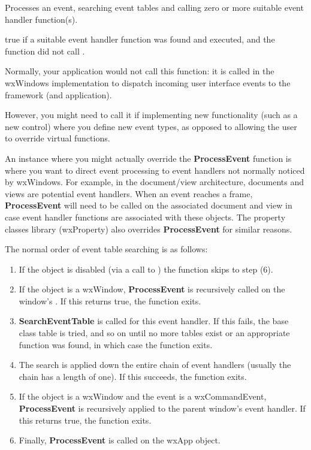 \label{wxevthandlerprocessevent}


Processes an event, searching event tables and calling zero or more suitable event handler function(s).




true if a suitable event handler function was found and executed, and the function did not
call .


Normally, your application would not call this function: it is called in the wxWindows
implementation to dispatch incoming user interface events to the framework (and application).

However, you might need to call it if implementing new functionality (such as a new control) where
you define new event types, as opposed to allowing the user to override virtual functions.

An instance where you might actually override the {\bf ProcessEvent} function is where you want
to direct event processing to event handlers not normally noticed by wxWindows. For example,
in the document/view architecture, documents and views are potential event handlers.
When an event reaches a frame, {\bf ProcessEvent} will need to be called on the associated
document and view in case event handler functions are associated with these objects.
The property classes library (wxProperty) also overrides {\bf ProcessEvent} for similar reasons.

The normal order of event table searching is as follows:

\begin{enumerate}\itemsep=0pt
\item If the object is disabled (via a call to )
the function skips to step (6).
\item If the object is a wxWindow, {\bf ProcessEvent} is recursively called on the window's\rtfsp
{}. If this returns true, the function exits.
\item {\bf SearchEventTable} is called for this event handler. If this fails, the base
class table is tried, and so on until no more tables exist or an appropriate function was found,
in which case the function exits.
\item The search is applied down the entire chain of event handlers (usually the chain has a length
of one). If this succeeds, the function exits.
\item If the object is a wxWindow and the event is a wxCommandEvent, {\bf ProcessEvent} is
recursively applied to the parent window's event handler. If this returns true, the function exits.
\item Finally, {\bf ProcessEvent} is called on the wxApp object.
\end{enumerate}

